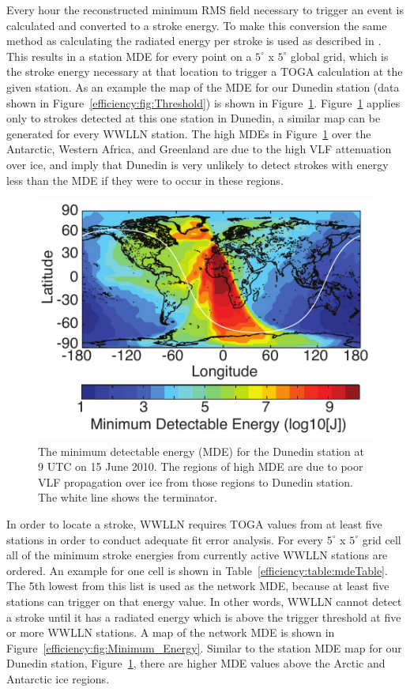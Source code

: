 Every hour the reconstructed minimum RMS field necessary to trigger an event is calculated and converted to a stroke energy.
To make this conversion the same method as calculating the radiated energy per stroke is used as described in \citet{Hutchins2012}.
This results in a station MDE for every point on a $5^\circ$ x $5^\circ$ global grid, which is the stroke energy necessary at that location to trigger a TOGA calculation at the given station.
As an example the map of the MDE for our Dunedin station (data shown in Figure~\ref{efficiency:fig:Threshold}) is shown in Figure~\ref{efficiency:fig:Threshold_Map}.
Figure~\ref{efficiency:fig:Threshold_Map} applies only to strokes detected at this one station in Dunedin, a similar map can be generated for every WWLLN station.
The high MDEs in Figure~\ref{efficiency:fig:Threshold_Map} over the Antarctic, Western Africa, and Greenland are due to the high VLF attenuation over ice, and imply that Dunedin is very unlikely to detect strokes with energy less than the MDE if they were to occur in these regions.

\begin{figure}[ht!]
   \centering
\noindent\includegraphics[scale=1]{efficiency/Figures/2012RS005049-p3.pdf}
   \caption{The minimum detectable energy (MDE) for the Dunedin station at 9 UTC on 15 June 2010.
The regions of high MDE are due to poor VLF propagation over ice from those regions to Dunedin station.
The white line shows the terminator.}
   \label{efficiency:fig:Threshold_Map}
\end{figure}

In order to locate a stroke, WWLLN requires TOGA values from at least five stations in order to conduct adequate fit error analysis.
For every $5^\circ$ x $5^\circ$ grid cell all of the minimum stroke energies from currently active WWLLN stations are ordered.
An example for one cell is shown in Table~\ref{efficiency:table:mdeTable}.
The 5th lowest from this list is used as the network MDE, because at least five stations can trigger on that energy value.
In other words, WWLLN cannot detect a stroke until it has a radiated energy which is above the trigger threshold at five or more WWLLN stations.
A map of the network MDE is shown in Figure~\ref{efficiency:fig:Minimum_Energy}.
Similar to the station MDE map for our Dunedin station, Figure~\ref{efficiency:fig:Threshold_Map}, there are higher MDE values above the Arctic and Antarctic ice regions.

